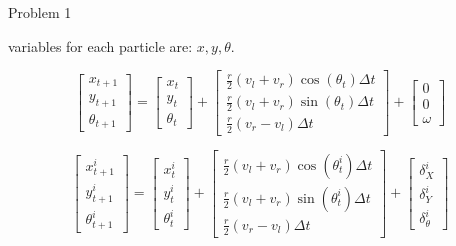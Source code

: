 \documentclass{article}
\begin{document}
\begin{problem}{Problem 1}

\begin{problem}{1.1}
variables for each particle are: $x, y, \theta$.
\end{problem}
\begin{problem}{1.2}
\[
    \begin{bmatrix}
        x_{t+1} \\
        y_{t+1} \\
        \theta_{t+1}
    \end{bmatrix}
    =
    \begin{bmatrix}
        x_t \\
        y_t \\
        \theta_t
    \end{bmatrix}
    +
    \begin{bmatrix}
        \frac{r}{2} (v_l + v_r) \cos(\theta_t) \Delta t \\
        \frac{r}{2} (v_l + v_r) \sin(\theta_t) \Delta t \\
        \frac{r}{2} (v_r - v_l) \Delta t
    \end{bmatrix}
    +
    \begin{bmatrix}
        0 \\
        0 \\
        \omega
    \end{bmatrix}
\]
\end{problem}

\begin{problem}{1.3}
\[
    \begin{bmatrix}
        x_{t+1}^i \\
        y_{t+1}^i \\
        \theta_{t+1}^i
    \end{bmatrix}
    =
    \begin{bmatrix}
        x_t^i \\
        y_t^i \\
        \theta_t^i
    \end{bmatrix}
    +
    \begin{bmatrix}
        \frac{r}{2}(v_l + v_r) \cos(\theta_t^i) \Delta t \\
        \frac{r}{2}(v_l + v_r) \sin(\theta_t^i) \Delta t \\
        \frac{r}{2}(v_r - v_l) \Delta t
    \end{bmatrix}
    +
    \begin{bmatrix}
        \delta_X^i \\
        \delta_Y^i \\
        \delta_\theta^i
    \end{bmatrix}
\]


\end{problem}
\end{problem}
\end{document}
